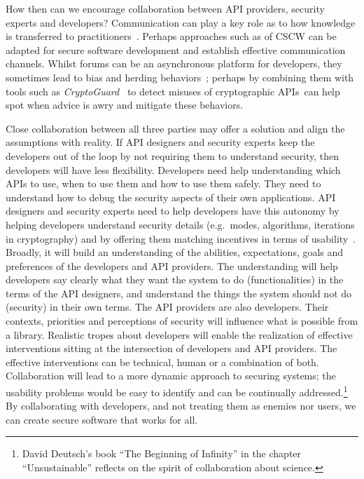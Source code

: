 \documentclass[conference]{IEEEtran}
\begin{document}
How then can we encourage collaboration between API providers, security experts and developers?  Communication can play a key role as to how knowledge is transferred to practitioners~\cite{claeys2019}. Perhaps approaches such as of \acl{CSCW} can be adapted for secure software development and establish effective communication channels. Whilst forums can be an asynchronous platform for developers, they sometimes lead to bias and herding behaviors~\cite{emmasurface2020}; perhaps by combining them with tools such as \emph{CryptoGuard}~\cite{rahaman2018tutorial} to  detect misuses of cryptographic APIs~can help spot when advice is awry and mitigate these behaviors.

Close collaboration between all three parties may offer a solution and  align the assumptions with reality. If API designers and security experts keep the developers out of the loop by not requiring them to understand security, then developers will have less flexibility. Developers need help understanding which APIs to use, when to use them and how to use them safely. They need to understand how to debug the security aspects of their own applications.  API designers and security experts need to help developers have this autonomy by helping developers understand security details (e.g.~modes, algorithms, iterations in cryptography) and by offering them matching incentives in terms of usability~\cite{aside2012,weir2020,tahaei2021sat}. Broadly, it will build an understanding of the abilities, expectations, goals and preferences of the developers and API providers. The understanding will help developers say clearly what they want the system to do (functionalities) in the terms of the API designers, and understand the things the system should not do (security) in their own terms.  The API providers are also developers. Their contexts, priorities and perceptions of security will influence what is possible from a library. Realistic tropes about developers will enable the realization of effective interventions sitting at the intersection of developers and API providers. The effective interventions can be technical, human or a combination of both. Collaboration will lead to a more dynamic approach to securing systems; the usability problems would be easy to identify and can be continually addressed.\footnote{David Deutsch's book ``The Beginning of Infinity'' in the chapter ``Unsustainable'' reflects on the spirit of collaboration about science.} By collaborating with developers, and not treating them as enemies nor users, we can create secure software that works for all.

\balance


\end{document}
